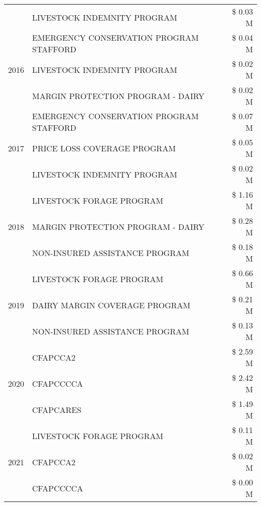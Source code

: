\begin{tabular}{llr}
 & LIVESTOCK INDEMNITY PROGRAM & \$ 0.03 M \\
\cline{1-3}
\multirow[t]{3}{*}{2016} & EMERGENCY CONSERVATION PROGRAM STAFFORD & \$ 0.04 M \\
 & LIVESTOCK INDEMNITY PROGRAM & \$ 0.02 M \\
 & MARGIN PROTECTION PROGRAM - DAIRY & \$ 0.02 M \\
\cline{1-3}
\multirow[t]{3}{*}{2017} & EMERGENCY CONSERVATION PROGRAM STAFFORD & \$ 0.07 M \\
 & PRICE LOSS COVERAGE PROGRAM & \$ 0.05 M \\
 & LIVESTOCK INDEMNITY PROGRAM & \$ 0.02 M \\
\cline{1-3}
\multirow[t]{3}{*}{2018} & LIVESTOCK FORAGE PROGRAM & \$ 1.16 M \\
 & MARGIN PROTECTION PROGRAM - DAIRY & \$ 0.28 M \\
 & NON-INSURED ASSISTANCE PROGRAM & \$ 0.18 M \\
\cline{1-3}
\multirow[t]{3}{*}{2019} & LIVESTOCK FORAGE PROGRAM & \$ 0.66 M \\
 & DAIRY MARGIN COVERAGE PROGRAM & \$ 0.21 M \\
 & NON-INSURED ASSISTANCE PROGRAM & \$ 0.13 M \\
\cline{1-3}
\multirow[t]{3}{*}{2020} & CFAPCCA2 & \$ 2.59 M \\
 & CFAPCCCCA & \$ 2.42 M \\
 & CFAPCARES & \$ 1.49 M \\
\cline{1-3}
\multirow[t]{3}{*}{2021} & LIVESTOCK FORAGE PROGRAM & \$ 0.11 M \\
 & CFAPCCA2 & \$ 0.02 M \\
 & CFAPCCCCA & \$ 0.00 M \\
\cline{1-3}
\bottomrule
\end{tabular}
